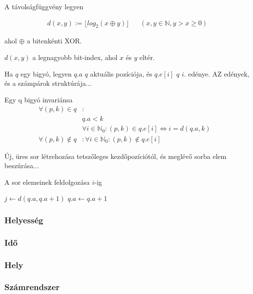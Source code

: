 \documentclass[12pt]{report}
\begin{document}
A távolságfüggvény legyen

\begin{align*}
d(x, y) := \lfloor log_{2}{}(x \oplus y) \rfloor & & (x, y \in \mathbb{N}, y > x \ge 0)
\end{align*}

ahol $\oplus$ a bitenkénti XOR.

$d(x, y)$ a legnagyobb bit-index, ahol $x$ és $y$ eltér.

Ha $q$ egy bigyó, legyen $q.a$ $q$ aktuális pozíciója, és $q.e[i]$ $q$ $i$. edénye. AZ edények, és a számpárok struktúrája...

Egy q bigyó invariánsa
\begin{align*}
\forall (p, k) \in q &: &\\ 
	& q.a < k\\
	& \forall i \in \mathbb{N}_{0}: (p, k) \in q.e[i] \iff i=d(q.a, k) \\
\forall (p, k) \not\in q &: \forall i \in \mathbb{N}_{0}: (p, k) \not\in q.e[i]
\end{align*}

Új, üres sor létrehozása tetszőleges kezdőpozíciótól, és meglévő sorba elem beszúrása...

A sor elemeinek feldolgozása $i$-ig
\begin{algorithmic}[1]
	\State $j \gets d(q.a, q.a + 1)$
	\State $q.a \gets q.a + 1$
		\State {}
			\State {}
		\Else
			\State {}
		\EndIf
	\EndFor
\EndWhile
\end{algorithmic}

\subsubsection{Helyesség}

\subsubsection{Idő}

\subsubsection{Hely}

\subsubsection{Számrendszer}
\end{document}
